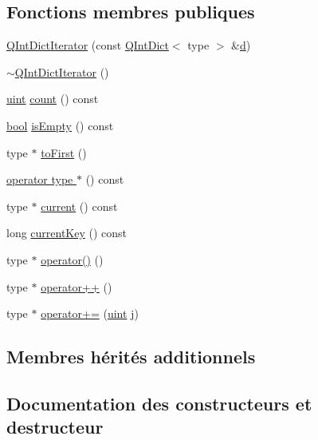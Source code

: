\subsection*{Fonctions membres publiques}
\begin{DoxyCompactItemize}
\item 
\hyperlink{class_q_int_dict_iterator_a86a4f264c764e480f05fdcc3a5d0ab48}{Q\+Int\+Dict\+Iterator} (const \hyperlink{class_q_int_dict}{Q\+Int\+Dict}$<$ type $>$ \&\hyperlink{060__command__switch_8tcl_af43f4b1f0064a33b2d662af9f06d3a00}{d})
\item 
\hyperlink{class_q_int_dict_iterator_aabf8fe3639a32079d90f801e1fb0f901}{$\sim$\+Q\+Int\+Dict\+Iterator} ()
\item 
\hyperlink{qglobal_8h_a4d3943ddea65db7163a58e6c7e8df95a}{uint} \hyperlink{class_q_int_dict_iterator_ac9db8141b5585ff3313f7dd7c34e7ee3}{count} () const 
\item 
\hyperlink{qglobal_8h_a1062901a7428fdd9c7f180f5e01ea056}{bool} \hyperlink{class_q_int_dict_iterator_ad0be1b4de5a93aa58463649360c824c1}{is\+Empty} () const 
\item 
type $\ast$ \hyperlink{class_q_int_dict_iterator_a33b6a043078a96bc09ade5c2b34fe4a5}{to\+First} ()
\item 
\hyperlink{class_q_int_dict_iterator_a1db240c72d1cd3a920906d883dd3fdb1}{operator type $\ast$} () const 
\item 
type $\ast$ \hyperlink{class_q_int_dict_iterator_a68f1151c6a2bbfca36dc5d4effb7e3cd}{current} () const 
\item 
long \hyperlink{class_q_int_dict_iterator_aa45d4c13d94755a69329447e7aff6728}{current\+Key} () const 
\item 
type $\ast$ \hyperlink{class_q_int_dict_iterator_a5e6a7783d95670524c5e0f1b7a264845}{operator()} ()
\item 
type $\ast$ \hyperlink{class_q_int_dict_iterator_a1225f5d0427763966d1f5525c7d6a38a}{operator++} ()
\item 
type $\ast$ \hyperlink{class_q_int_dict_iterator_afc1f2790370fc483def77c3434a03978}{operator+=} (\hyperlink{qglobal_8h_a4d3943ddea65db7163a58e6c7e8df95a}{uint} \hyperlink{060__command__switch_8tcl_a2aaa92757686acea102cba3475f0c13b}{j})
\end{DoxyCompactItemize}
\subsection*{Membres hérités additionnels}


\subsection{Documentation des constructeurs et destructeur}
\hypertarget{class_q_int_dict_iterator_a86a4f264c764e480f05fdcc3a5d0ab48}{}
